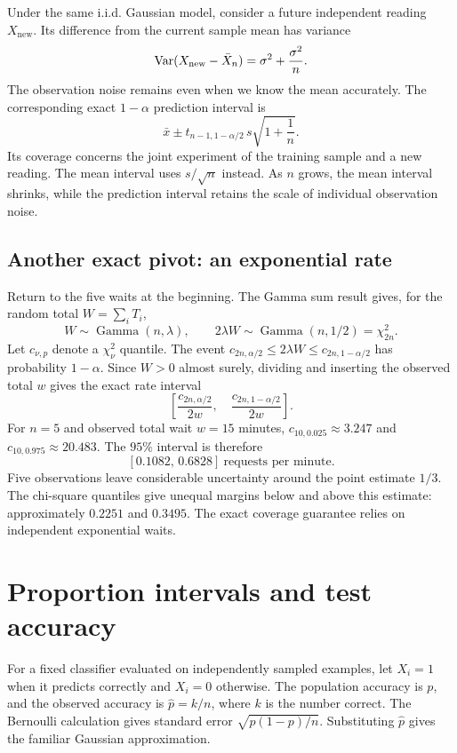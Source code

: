 Under the same i.i.d. Gaussian model, consider a future independent
reading \(X_{\mathrm{new}}\). Its difference from the current sample
mean has variance
\[
  \operatorname{Var}(X_{\mathrm{new}}-\bar X_n)
  =\sigma^2+\frac{\sigma^2}{n}.
\]
The observation noise remains even when we know the mean accurately.
The corresponding exact \(1-\alpha\) prediction interval is
\[
  \bar x\pm t_{n-1,1-\alpha/2}\,s\sqrt{1+\frac1n}.
\]
Its coverage concerns the joint experiment of the training sample
and a new reading. The mean interval uses \(s/\sqrt n\) instead.
As \(n\) grows, the mean interval shrinks, while the prediction
interval retains the scale of individual observation noise.

\subsection{Another exact pivot: an exponential rate}

Return to the five waits at the beginning. The Gamma sum result gives,
for the random total \(W=\sum_iT_i\),
\[
  W\sim\operatorname{Gamma}(n,\lambda),\qquad
  2\lambda W\sim\operatorname{Gamma}(n,1/2)=\chi^2_{2n}.
\]
Let \(c_{\nu,p}\) denote a \(\chi^2_\nu\) quantile. The event
\(c_{2n,\alpha/2}\le2\lambda W\le c_{2n,1-\alpha/2}\)
has probability \(1-\alpha\). Since \(W>0\) almost surely, dividing
and inserting the observed total \(w\) gives the exact rate interval
\[
  \left[\frac{c_{2n,\alpha/2}}{2w},\quad
        \frac{c_{2n,1-\alpha/2}}{2w}\right].
\]
For \(n=5\) and observed total wait \(w=15\) minutes,
\(c_{10,0.025}\approx3.247\) and
\(c_{10,0.975}\approx20.483\). The \(95\%\) interval is therefore
\[
  [0.1082,\,0.6828]\ \text{requests per minute}.
\]
Five observations leave considerable uncertainty around the point
estimate \(1/3\). The chi-square quantiles give unequal margins below
and above this estimate: approximately \(0.2251\) and \(0.3495\).
The exact coverage guarantee relies on independent exponential waits.

\section{Proportion intervals and test accuracy}
\label{sec:proportion-intervals}

For a fixed classifier evaluated on independently sampled examples,
let \(X_i=1\) when it predicts correctly and \(X_i=0\) otherwise.
The population accuracy is \(p\), and the observed accuracy is
\(\widehat p=k/n\), where \(k\) is the number correct.
The Bernoulli calculation gives standard error
\(\sqrt{p(1-p)/n}\). Substituting \(\widehat p\) gives the
familiar Gaussian approximation.


